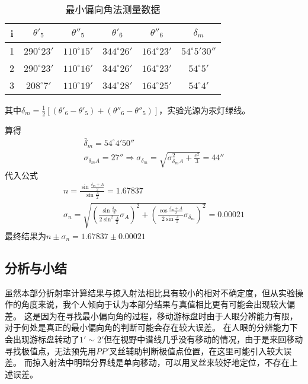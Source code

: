 \documentclass[12pt, a4paper]{ctexart}
\begin{document}
\begin{table}[htbp]
  \centering
  \caption{最小偏向角法测量数据}
    \begin{tabular}{cccccc}
    \toprule
    i     & $\theta'_5$ & $\theta''_5$ & $\theta'_6$ & $\theta''_6$ & $\delta_m$ \\
    \midrule
    1     & $290^{\circ}23'$ & $110^{\circ}15'$ & $344^{\circ}26'$ & $164^{\circ}23'$ & $54^{\circ}5'30''$ \\
    2     & $290^{\circ}23'$ & $110^{\circ}16'$ & $344^{\circ}26'$ & $164^{\circ}23'$ & $54^{\circ}5'$     \\
    3     & $208^{\circ}7'$  & $110^{\circ}19'$ & $344^{\circ}28'$ & $164^{\circ}25'$ & $54^{\circ}4'$     \\
    \bottomrule
    \end{tabular}
  \label{tab:t3}
\end{table}
其中$\delta_m = \frac12 [(\theta'_6 - \theta'_5) + (\theta''_6 - \theta''_5)]$，实验光源为汞灯绿线。

算得
\begin{gather*}
    \bar{\delta}_m = 54^{\circ}4'50'' \\
    \sigma_{\delta_m A} = 27'' \Rightarrow \sigma_{\delta_m} = \sqrt{\sigma_{\delta_m A}^2 + \frac{e^2}{3}} = 44''
\end{gather*}
代入公式
\begin{gather*}
  n = \frac{\sin \frac{\delta_m + A}{2}}{\sin \frac{A}{2}} = 1.67837\\
  \sigma_n = \sqrt{(\frac{\sin \frac{\delta_m}{2}}{2\sin^2 \frac{A}{2}}\sigma_A)^2 + (\frac{\cos \frac{\delta_m + A}{2}}{2\sin \frac{A}{2}}\sigma_{\delta_m})^2} = 0.00021
\end{gather*}
最终结果为$n \pm \sigma_n = 1.67837 \pm 0.00021$

\subsection{分析与小结}

虽然本部分折射率计算结果与掠入射法相比具有较小的相对不确定度，但从实验操作的角度来说，我个人倾向于认为本部分结果与真值相比更有可能会出现较大偏差。
这是因为在寻找最小偏向角的过程，移动游标盘时由于人眼分辨能力有限，对于何处是真正的最小偏向角的判断可能会存在较大误差。
在人眼的分辨能力下会出现游标盘转动了$1' \sim 2'$但在视野中谱线几乎没有移动的情况，由于是来回移动寻找极值点，无法预先用$PP'$叉丝辅助判断极值点位置，在这里可能引入较大误差。
而掠入射法中明暗分界线是单向移动，可以用叉丝来较好地定位，不存在上述误差。
\end{document}
